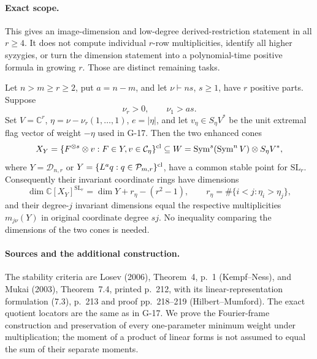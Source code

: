 \paragraph{Exact scope.}
This gives an image-dimension and low-degree derived-restriction
statement in all $r\ge4$. It does not compute individual
$r$-row multiplicities, identify all higher syzygies, or
turn the dimension statement into a polynomial-time positive
formula in growing $r$. Those are distinct remaining tasks.


\begin{proposition}\label{G-22}
Let $n>m\ge r\ge2$, put $a=n-m$, and let
$\nu\vdash ns$, $s\ge1$, have $r$ positive parts. Suppose
\[
 \nu_r>0,\qquad \nu_1>as.
\]
Set $V=\mathbb C^r$, $\eta=\nu-\nu_r(1,\ldots,1)$,
$e=|\eta|$, and let $v_\eta\in S_\eta V^*$ be the unit
extremal flag vector of weight $-\eta$ used in G-17.
Then the two enhanced cones
\[
 X_Y=\{F^{\otimes s}\otimes v:F\in Y,
                  v\in\mathcal C_\eta\}^{\rm cl}
 \subseteq W=\operatorname{Sym}^s(\operatorname{Sym}^nV)
                         \otimes S_\eta V^*,
\]
where $Y=\mathcal D_{n,r}$ or
$Y=\{L^a q:q\in\mathcal P_{m,r}\}^{\rm cl}$,
have a common stable point for $\mathrm{SL}_r$.
Consequently their invariant coordinate rings have dimensions
\[
 \dim\mathbb C[X_Y]^{\mathrm{SL}_r}
 =\dim Y+r_\eta-(r^2-1),\qquad
 r_\eta=\#\{i<j:\eta_i>\eta_j\},
\]
and their degree-$j$ invariant dimensions equal the respective
multiplicities $m_{j\nu}(Y)$ in original coordinate degree $sj$.
No inequality comparing the dimensions of the two cones is needed.
\end{proposition}

\paragraph{Sources and the additional construction.}
The stability criteria are Losev (2006), Theorem~4, p.~1
(Kempf--Ness), and Mukai (2003), Theorem~7.4, printed p.~212,
with its linear-representation formulation (7.3), p.~213
and proof pp.~218--219 (Hilbert--Mumford). The exact quotient
locators are the same as in G-17. We prove the Fourier-frame
construction and preservation of every one-parameter minimum
weight under multiplication; the moment of a product of linear
forms is not assumed to equal the sum of their separate moments.

